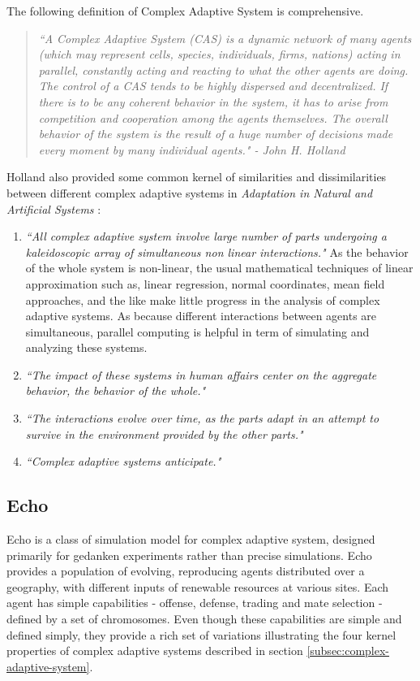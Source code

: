 The following definition of Complex Adaptive System is comprehensive.

\begin{quote}
\textsl{``A Complex Adaptive System (CAS) is a dynamic network of many agents (which may represent cells, species, individuals, firms, nations) acting in parallel, constantly acting and reacting to what the other agents are doing. The control of a CAS tends to be highly dispersed and decentralized. If there is to be any coherent behavior in the system, it has to arise from competition and cooperation among the agents themselves. The overall behavior of the system is the result of a huge number of decisions made every moment by many individual agents." - John H. Holland}
\end{quote}

Holland also provided some common kernel of similarities and dissimilarities between different complex adaptive systems in \textsl{Adaptation in Natural and Artificial Systems} \cite{holland1975}:

\begin{enumerate}
	\item \textsl{``All complex adaptive system involve large number of parts undergoing a kaleidoscopic array of simultaneous non linear interactions."} As the behavior of the whole system is non-linear, the usual mathematical techniques of linear approximation such as, linear regression, normal coordinates, mean field approaches, and the like make little progress in the analysis of complex adaptive systems. As because different interactions between agents are simultaneous, parallel computing is helpful in term of simulating and analyzing these systems. 
	\item \textsl{``The impact of these systems in human affairs center on the aggregate behavior, the behavior of the whole."}
	\item \textsl{``The interactions evolve over time, as the parts adapt in an attempt to survive in the environment provided by the other parts."}
	\item \textsl{``Complex adaptive systems anticipate."}
\end{enumerate}

\subsection{Echo}
\label{subsec:echo}
Echo is a class of simulation model for complex adaptive system, designed primarily for gedanken experiments rather than precise simulations. Echo provides a population of evolving, reproducing agents distributed over a geography, with different inputs of renewable resources at various sites. Each agent has simple capabilities - offense, defense, trading and mate selection - defined by a set of chromosomes. Even though these capabilities are simple and defined simply, they provide a rich set of variations illustrating the four kernel properties of complex adaptive systems described in section \ref{subsec:complex-adaptive-system}.

